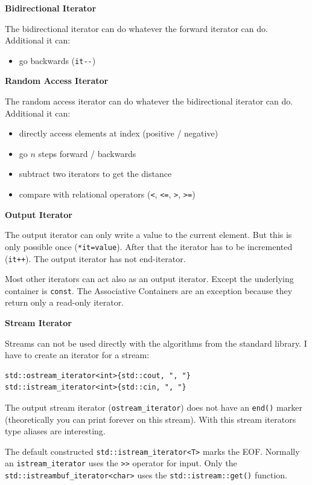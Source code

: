 \documentclass[11pt,twoside,landscape]{article}
\begin{document}
\begin{multicols}{3}
\textbf{Bidirectional Iterator}

The bidirectional iterator can do whatever the forward iterator can do.
Additional it can:
\begin{itemize}
\item go backwards (\texttt{it-{}-})
\end{itemize}

\textbf{Random Access Iterator}

The random access iterator can do whatever the bidirectional iterator can do.
Additional it can:
\begin{itemize}
\item directly access elements at index (positive / negative)
\item go \(n\) steps forward / backwards
\item subtract two iterators to get the distance
\item compare with relational operators (\texttt{<}, \texttt{<=}, \texttt{>}, \texttt{>=})
\end{itemize}


\textbf{Output Iterator}

The output iterator can only write a value to the current element.
But this is only possible once (\texttt{*it=value}).
After that the iterator has to be incremented (\texttt{it++}).
The output iterator has not end-iterator. 

Most other iterators can act also as an output iterator.
Except the underlying container is \texttt{const}.
The Associative Containers are an exception because they return only a read-only iterator.

\textbf{Stream Iterator}

Streams can not be used directly with the algorithms from the standard library.
I have to create an iterator for a stream:
\lstset{language=c++,label= ,caption= ,captionpos=b,numbers=none}
\begin{lstlisting}
std::ostream_iterator<int>{std::cout, ", "}
std::istream_iterator<int>{std::cin, ", "}
\end{lstlisting}

The output stream iterator (\texttt{ostream\_iterator}) does not have an \texttt{end()} marker (theoretically you can print forever on this stream).
With this stream iterators type aliases are interesting.

The default constructed \texttt{std::istream\_iterator<T>} marks the EOF.
Normally an \texttt{istream\_iterator} uses the \texttt{>>} operator for input.
Only the \texttt{std::istreambuf\_iterator<char>} uses the \texttt{std::istream::get()} function.


\end{multicols}
\end{document}
